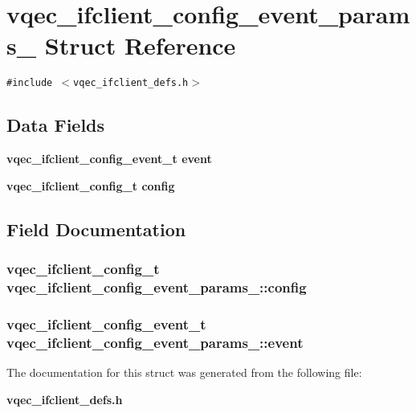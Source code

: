 \section{vqec\_\-ifclient\_\-config\_\-event\_\-params\_\- Struct Reference}
\label{structvqec__ifclient__config__event__params__}
{\tt \#include $<$vqec\_\-ifclient\_\-defs.h$>$}

\subsection*{Data Fields}
\begin{CompactItemize}
\item 
\bf{vqec\_\-ifclient\_\-config\_\-event\_\-t} \bf{event}
\item 
\bf{vqec\_\-ifclient\_\-config\_\-t} \bf{config}
\end{CompactItemize}


\subsection{Field Documentation}
\subsubsection{\setlength{\rightskip}{0pt plus 5cm}\bf{vqec\_\-ifclient\_\-config\_\-t} \bf{vqec\_\-ifclient\_\-config\_\-event\_\-params\_\-::config}}\label{structvqec__ifclient__config__event__params___bd0a73ec20f1a26b495654462e34d582}


\subsubsection{\setlength{\rightskip}{0pt plus 5cm}\bf{vqec\_\-ifclient\_\-config\_\-event\_\-t} \bf{vqec\_\-ifclient\_\-config\_\-event\_\-params\_\-::event}}\label{structvqec__ifclient__config__event__params___bb5552060f02a072d7f8e6e12a44aef2}




The documentation for this struct was generated from the following file:\begin{CompactItemize}
\item 
\bf{vqec\_\-ifclient\_\-defs.h}\end{CompactItemize}
